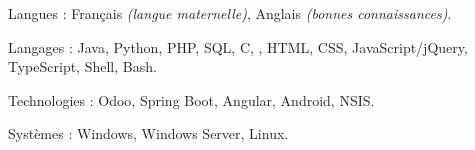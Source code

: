 \begin{indentsection}{\parindent}
  \begin{description*}
    \item[Langues :]
    Français \emph{(langue maternelle)}, %
    Anglais \emph{(bonnes connaissances)}.
    \item[Langages :] Java, Python, PHP, SQL, C, \Csharp, HTML,
    CSS, JavaScript/jQuery, TypeScript, Shell, Bash.
    \item[Technologies :] Odoo, Spring Boot, Angular, Android, NSIS.
    \item[Systèmes :] Windows, Windows Server, Linux.
  \end{description*}
\end{indentsection}
